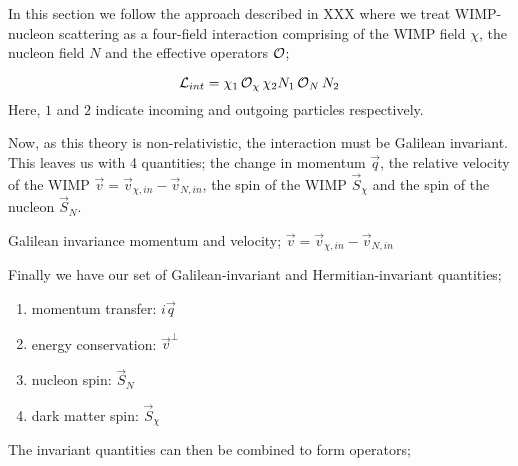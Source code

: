 \par
In this section we follow the approach described in XXX where we treat WIMP-nucleon scattering as a four-field interaction comprising of the WIMP field $\chi$, the nucleon field $N$ and the effective operators $\operatorname{\mathcal{O}}$;

\begin{equation}
    \operatorname{\mathcal{L}}_{int} = \chi_{1} \operatorname{\mathcal{O}}_{\chi} \chi_{2} N_{1} \operatorname{\mathcal{O}}_{N} N_{2}
\end{equation}
Here, $1$ and $2$ indicate incoming and outgoing particles respectively.

\par
Now, as this theory is non-relativistic, the interaction must be Galilean invariant.
This leaves us with 4 quantities; the change in momentum $\vec{q}$, the relative velocity of the WIMP $\vec{v}=\vec{v}_{\chi,in} - \vec{v}_{N,in}$, the spin of the WIMP $\vec{S}_{\chi}$ and the spin of the nucleon $\vec{S}_{N}$.




\par
Galilean invariance momentum and velocity;
$\Vec{v} = \Vec{v}_{\chi,in} - \Vec{v}_{N,in}$

\par
Finally we have our set of Galilean-invariant and Hermitian-invariant quantities;
\begin{enumerate}
    \item momentum transfer: $i\Vec{q}$
    \item energy conservation: $\Vec{v}^{\bot}$
    \item nucleon spin: $\Vec{S}_{N}$
    \item dark matter spin: $\Vec{S}_{\chi}$
\end{enumerate}

\par
The invariant quantities can then be combined to form operators;

